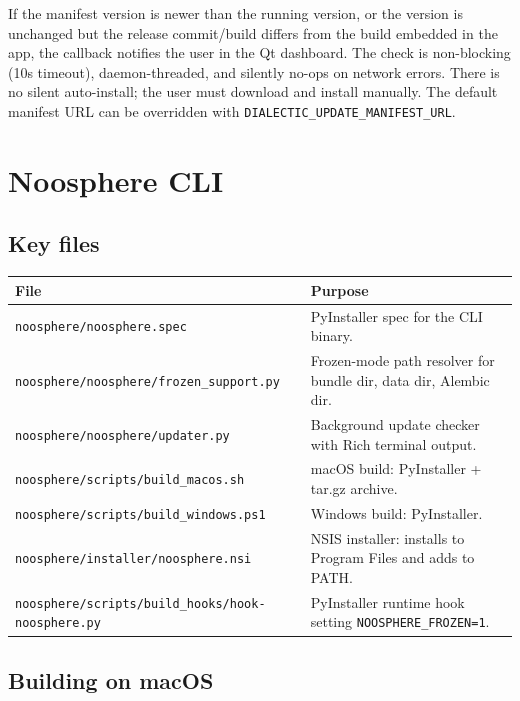\documentclass[11pt,letterpaper]{article}
\newcommand{\file}[1]{\texttt{#1}}
\newcommand{\cmd}[1]{\texttt{#1}}
\begin{document}
If the manifest version is newer than the running version, or the version is unchanged but the release commit/build differs from the build embedded in the app, the callback notifies the user in the Qt dashboard. The check is non-blocking (10s timeout), daemon-threaded, and silently no-ops on network errors. There is no silent auto-install; the user must download and install manually. The default manifest URL can be overridden with \cmd{DIALECTIC_UPDATE_MANIFEST_URL}.

\section{Noosphere CLI}

\subsection{Key files}

\begin{table}[h]
\small
\begin{tabular}{p{5.8cm} p{8.7cm}}
\toprule
\textbf{File} & \textbf{Purpose} \\
\midrule
\file{noosphere/noosphere.spec}                 & PyInstaller spec for the CLI binary. \\
\file{noosphere/noosphere/frozen\_support.py}   & Frozen-mode path resolver for bundle dir, data dir, Alembic dir. \\
\file{noosphere/noosphere/updater.py}           & Background update checker with Rich terminal output. \\
\file{noosphere/scripts/build\_macos.sh}        & macOS build: PyInstaller + tar.gz archive. \\
\file{noosphere/scripts/build\_windows.ps1}     & Windows build: PyInstaller. \\
\file{noosphere/installer/noosphere.nsi}        & NSIS installer: installs to Program Files and adds to PATH. \\
\file{noosphere/scripts/build\_hooks/hook-noosphere.py} & PyInstaller runtime hook setting \cmd{NOOSPHERE\_FROZEN=1}. \\
\bottomrule
\end{tabular}
\end{table}

\subsection{Building on macOS}
\end{document}
